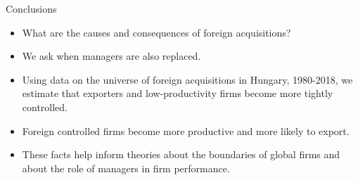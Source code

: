 \documentclass[
  ignorenonframetext,
  aspectratio=43,
]{beamer}
\providecommand{\tightlist}{%
  \setlength{\itemsep}{0pt}\setlength{\parskip}{0pt}}
\begin{document}
\begin{frame}{Conclusions}
\protect\hypertarget{conclusions-1}{}
\begin{itemize}
\tightlist
\item
  What are the causes and consequences of foreign acquisitions?
\item
  We ask when managers are also replaced.
\item
  Using data on the universe of foreign acquisitions in Hungary,
  1980-2018, we estimate that exporters and low-productivity firms
  become more tightly controlled.
\item
  Foreign controlled firms become more productive and more likely to
  export.
\item
  These facts help inform theories about the boundaries of global firms
  and about the role of managers in firm performance.
\end{itemize}
\end{frame}
\end{document}
